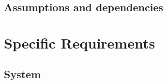 \documentclass{book}
\begin{document}
\section{Assumptions and dependencies}

\chapter{Specific Requirements} \label{c:req}

\section{System}
\end{document}
